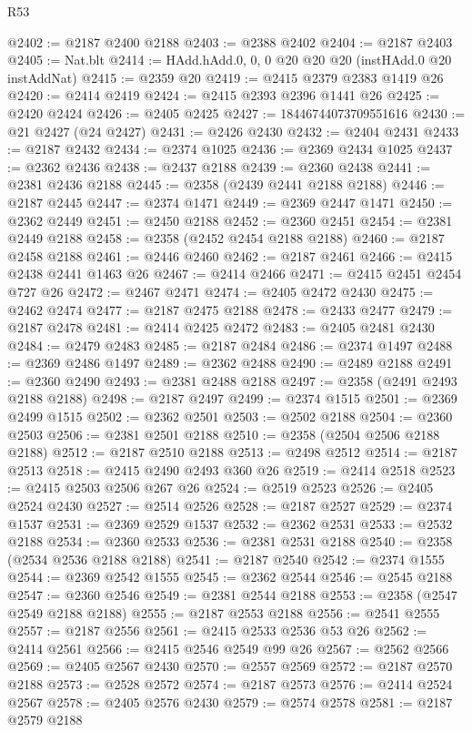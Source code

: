 \begin{lexlean}{R53}
\begin{coremodule}
@2402 := @2187 @2400 @2188
@2403 := @2388 @2402
@2404 := @2187 @2403
@2405 := Nat.blt
@2414 := HAdd.hAdd.{0, 0, 0} @20 @20 @20 (instHAdd.{0} @20 instAddNat)
@2415 := @2359 @20
@2419 := @2415 @2379 @2383 @1419 @26
@2420 := @2414 @2419
@2424 := @2415 @2393 @2396 @1441 @26
@2425 := @2420 @2424
@2426 := @2405 @2425
@2427 := 18446744073709551616
@2430 := @21 @2427 (@24 @2427)
@2431 := @2426 @2430
@2432 := @2404 @2431
@2433 := @2187 @2432
@2434 := @2374 @1025
@2436 := @2369 @2434 @1025
@2437 := @2362 @2436
@2438 := @2437 @2188
@2439 := @2360 @2438
@2441 := @2381 @2436 @2188
@2445 := @2358 (@2439 @2441 @2188 @2188)
@2446 := @2187 @2445
@2447 := @2374 @1471
@2449 := @2369 @2447 @1471
@2450 := @2362 @2449
@2451 := @2450 @2188
@2452 := @2360 @2451
@2454 := @2381 @2449 @2188
@2458 := @2358 (@2452 @2454 @2188 @2188)
@2460 := @2187 @2458 @2188
@2461 := @2446 @2460
@2462 := @2187 @2461
@2466 := @2415 @2438 @2441 @1463 @26
@2467 := @2414 @2466
@2471 := @2415 @2451 @2454 @727 @26
@2472 := @2467 @2471
@2474 := @2405 @2472 @2430
@2475 := @2462 @2474
@2477 := @2187 @2475 @2188
@2478 := @2433 @2477
@2479 := @2187 @2478
@2481 := @2414 @2425 @2472
@2483 := @2405 @2481 @2430
@2484 := @2479 @2483
@2485 := @2187 @2484
@2486 := @2374 @1497
@2488 := @2369 @2486 @1497
@2489 := @2362 @2488
@2490 := @2489 @2188
@2491 := @2360 @2490
@2493 := @2381 @2488 @2188
@2497 := @2358 (@2491 @2493 @2188 @2188)
@2498 := @2187 @2497
@2499 := @2374 @1515
@2501 := @2369 @2499 @1515
@2502 := @2362 @2501
@2503 := @2502 @2188
@2504 := @2360 @2503
@2506 := @2381 @2501 @2188
@2510 := @2358 (@2504 @2506 @2188 @2188)
@2512 := @2187 @2510 @2188
@2513 := @2498 @2512
@2514 := @2187 @2513
@2518 := @2415 @2490 @2493 @360 @26
@2519 := @2414 @2518
@2523 := @2415 @2503 @2506 @267 @26
@2524 := @2519 @2523
@2526 := @2405 @2524 @2430
@2527 := @2514 @2526
@2528 := @2187 @2527
@2529 := @2374 @1537
@2531 := @2369 @2529 @1537
@2532 := @2362 @2531
@2533 := @2532 @2188
@2534 := @2360 @2533
@2536 := @2381 @2531 @2188
@2540 := @2358 (@2534 @2536 @2188 @2188)
@2541 := @2187 @2540
@2542 := @2374 @1555
@2544 := @2369 @2542 @1555
@2545 := @2362 @2544
@2546 := @2545 @2188
@2547 := @2360 @2546
@2549 := @2381 @2544 @2188
@2553 := @2358 (@2547 @2549 @2188 @2188)
@2555 := @2187 @2553 @2188
@2556 := @2541 @2555
@2557 := @2187 @2556
@2561 := @2415 @2533 @2536 @53 @26
@2562 := @2414 @2561
@2566 := @2415 @2546 @2549 @99 @26
@2567 := @2562 @2566
@2569 := @2405 @2567 @2430
@2570 := @2557 @2569
@2572 := @2187 @2570 @2188
@2573 := @2528 @2572
@2574 := @2187 @2573
@2576 := @2414 @2524 @2567
@2578 := @2405 @2576 @2430
@2579 := @2574 @2578
@2581 := @2187 @2579 @2188

\end{coremodule}
\end{lexlean}

